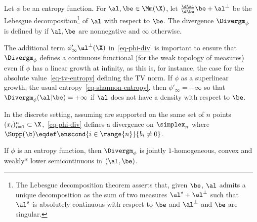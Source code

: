 \begin{defn}
\label{def_divergence}
Let $\phi$ be an entropy function.
For $\al,\be \in \Mm(\X)$, let $\frac{\d \al}{\d \be} \be + \al^{\perp}$ be the Lebesgue decomposition\footnote{The Lebesgue decomposition theorem asserts that, given $\be$, $\al$ admits a unique decomposition as the sum of two measures $\al^s + \al^\perp$ such that $\al^s$ is absolutely continuous with respect to $\be$ and $\al^\perp$ and $\be$ are singular.} of $\al$ with respect to $\be$. The divergence $\Divergm_\phi$ is defined by
if $\al,\be$ are nonnegative and $\infty$ otherwise.
\end{defn}%

The additional term $\phi'_\infty \al^{\perp}(\X)$ in~\eqref{eq-phi-div} is important to ensure that $\Divergm_\phi$ defines a continuous functional (for the weak topology of measures) even if $\phi$ has a linear growth at infinity, as this is, for instance, the case for the absolute value~\eqref{eq-tv-entropy} defining the TV norm. If $\phi$ as a superlinear growth, \eg the usual entropy~\eqref{eq-shannon-entropy}, then $\phi'_\infty=+\infty$ so that $\Divergm_\phi (\al|\be) = +\infty$ if $\al$ does not have a density with respect to $\be$. 

In the discrete setting, assuming 
are supported on the same set of $n$ points $(x_i)_{i=1}^n \subset \X$,~\eqref{eq-phi-div} defines a divergence on $\simplex_n$
where $\Supp(\b) \eqdef \enscond{i \in \range{n}}{ b_i \neq 0 }$.


\begin{proposition}
If $\phi$ is an entropy function, then $\Divergm_\phi$ is jointly $1$-homogeneous, convex and weakly* lower semicontinuous in $(\al,\be)$.
\end{proposition}

